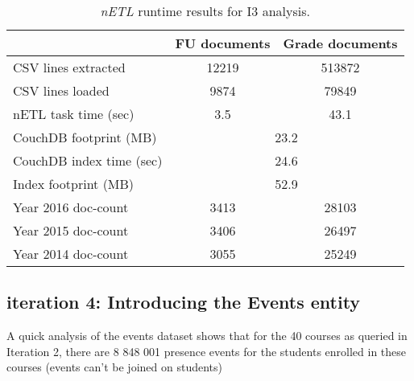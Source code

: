 \begin{table}[]
    \centering
    \caption{\textit{nETL} runtime results for I3 analysis.}
    \label{i3-results}
    \begin{tabular}{lcc}
                                 & FU documents             & Grade documents \\ \hline
        CSV lines extracted      & 12219                    & 513872          \\
        CSV lines loaded         & 9874                     & 79849           \\
        nETL task time (sec)     & 3.5                      & 43.1            \\
        CouchDB footprint (MB)   & \multicolumn{2}{c}{23.2}                   \\
        CouchDB index time (sec) & \multicolumn{2}{c}{24.6}                   \\
        Index footprint (MB)     & \multicolumn{2}{c}{52.9}                   \\
        Year 2016 doc-count      & 3413                     & 28103           \\
        Year 2015 doc-count      & 3406                     & 26497           \\
        Year 2014 doc-count      & 3055                     & 25249           \\
    \end{tabular}
\end{table}

\subsection{iteration 4: Introducing the Events entity}
A quick analysis of the events dataset shows that for the 40 courses as queried in Iteration 2, there are 8 848 001 presence events for the students enrolled in these courses (events can't be joined on students)